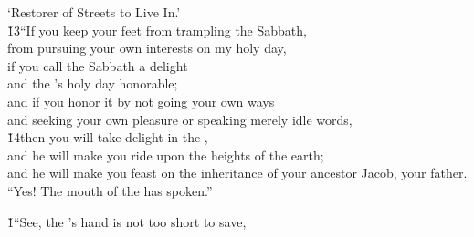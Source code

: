 \begin{poetry}
\poemll    `Restorer of Streets to Live In.' \\
\poeml \v{13}``If you keep your feet from trampling the Sabbath, \\
\poemll    from pursuing your own interests on my holy day, \\
\poeml if you call the Sabbath a delight \\
\poemll    and the 's holy day honorable; \\
\poeml and if you honor it by not going your own ways \\
\poemll    and seeking your own pleasure or speaking merely idle words, \\
\poeml \v{14}then you will take delight in the , \\
\poemll    and he will make you ride upon the heights of the earth; \\
\poeml and he will make you feast on the inheritance of your ancestor Jacob, your father. \\
\poeml ``Yes! The mouth of the  has spoken.''
\end{poetry}

\v{1}``See, the 's hand is not too short to save,

